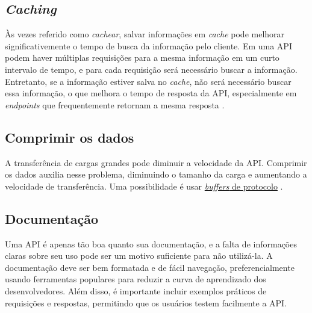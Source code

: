 
\subsection{\emph{Caching}}
Às vezes referido como \emph{cachear}, salvar informações em \emph{cache} pode melhorar significativemente o tempo de busca da informação pelo cliente. Em uma API podem haver múltiplas requisições para a mesma informação em um curto intervalo de tempo, e para cada requisição será necessário buscar a informação. Entretanto, se a informação estiver salva no \emph{cache}, não será necessário buscar essa informação, o que melhora o tempo de resposta da API, especialmente em \emph{endpoints} que frequentemente retornam a mesma resposta \cite{api-design-restfulapi}.

\subsection{Comprimir os dados}
A transferência de cargas grandes pode diminuir a velocidade da API. Comprimir os dados auxilia nesse problema, diminuindo o tamanho da carga e aumentando a velocidade de transferência. Uma possibilidade é usar \hyperref[subsecao-trocas-de-dados]{\emph{buffers} de protocolo} \cite{api-design-restfulapi}.

\subsection{Documentação}
Uma API é apenas tão boa quanto sua documentação, e a falta de informações claras sobre seu uso pode ser um motivo suficiente para não utilizá-la. A documentação deve ser bem formatada e de fácil navegação, preferencialmente usando ferramentas populares para reduzir a curva de aprendizado dos desenvolvedores. Além disso, é importante incluir exemplos práticos de requisições e respostas, permitindo que os usuários testem facilmente a API. \cite{api-design-restfulapi}



